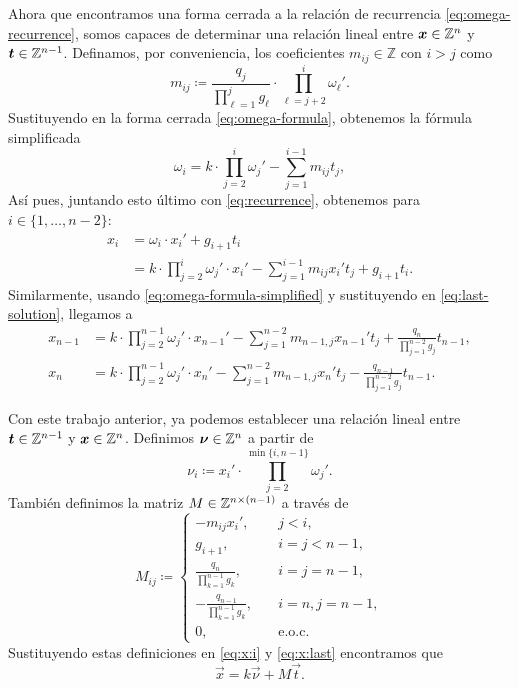 Ahora que encontramos una forma cerrada a la relación de recurrencia \eqref{eq:omega-recurrence},
somos capaces de determinar una relación lineal entre $\boldsymbol{x} \in \mathbb{Z}^n$ y $\boldsymbol{t} \in \mathbb{Z}^{n-1}$.
Definamos, por conveniencia, los coeficientes $m_{ij} \in \mathbb{Z}$ con $i > j$ como
\begin{equation}
	\label{phase-2:eq:coeffs}
	m_{ij} \coloneq \frac{q_j}{\prod_{\ell = 1}^{j}g_\ell} \cdot \prod_{\ell = j +
	2}^{i}\omega_\ell'.
\end{equation}
Sustituyendo en la forma cerrada \eqref{eq:omega-formula}, obtenemos la fórmula simplificada
\begin{equation}
	\label{eq:omega-formula-simplified}
	\omega_i =
	k \cdot \prod_{j=2}^{i} \omega_j'
	- \sum_{j=1}^{i - 1}m_{ij}t_j,
\end{equation}
Así pues, juntando esto último con \eqref{eq:recurrence}, obtenemos para $i \in \{1, \ldots, n -
2\}$: 
\begin{align}
	x_i &= \omega_i \cdot x_i' + g_{i + 1}t_i \nonumber \\
		&= k \cdot \prod_{j=2}^{i}\omega_j' \cdot x_i' - \sum_{j=1}^{i - 1}m_{ij}x_i'
		t_j + g_{i + 1}t_i \label{eq:x:i}.
\end{align}
Similarmente, usando \eqref{eq:omega-formula-simplified} y sustituyendo en \eqref{eq:last-solution},
llegamos a
\begin{subequations}
	\label{eq:x:last}
	\begin{align}
		x_{n-1} &= k \cdot \prod_{j=2}^{n-1} \omega_j' \cdot x_{n-1}' - \sum_{j=1}^{n-2}
		m_{n-1,j}x_{n-1}' t_j + \frac{q_n}{\prod_{j=1}^{n-2}g_j} t_{n-1}, \\
		x_{n} &= k \cdot \prod_{j=2}^{n-1} \omega_j' \cdot x_{n}' - \sum_{j=1}^{n-2}
		m_{n-1,j}x_{n}' t_j - \frac{q_{n - 1}}{\prod_{j=1}^{n-2}g_j} t_{n-1}.
	\end{align}
\end{subequations}

Con este trabajo anterior, ya podemos establecer una relación lineal entre $\boldsymbol{t} \in \mathbb{Z}^{n-1}$ y
$\boldsymbol{x} \in \mathbb{Z}^n$. Definimos $\boldsymbol{\nu} \in \mathbb{Z}^n$ a partir de
\begin{equation}
	\label{eq:vec-omega}
	\nu_i \coloneq x_i' \cdot \prod_{j = 2}^{\min{\lbrace i, n - 1 \rbrace}}\omega_j'.
\end{equation}
También definimos la matriz $M \in \mathbb{Z}^{n \times (n - 1)}$ a través de
\begin{equation}
	\label{eq:mat-T}
	M_{ij} \coloneq \begin{cases}
		-m_{ij}x_i', &\quad j < i, \\
		g_{i + 1},  &\quad i = j < n - 1, \\
		\frac{q_n}{\prod_{k=1}^{n-1}g_k}, &\quad i = j = n - 1, \\
		-\frac{q_{n-1}}{\prod_{k=1}^{n-1}g_k}, &\quad i = n, j = n - 1, \\
		0, &\quad \text{e.o.c.}
	\end{cases}
\end{equation}
Sustituyendo estas definiciones en \eqref{eq:x:i} y \eqref{eq:x:last} encontramos que
\begin{equation}
	\label{eq:transf}
	\vec{x} = k\vec{\nu} + M\vec{t}.
\end{equation}

